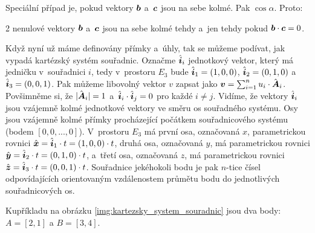 Speciální případ je, pokud vektory \(\boldsymbol{b}\) a~\(\boldsymbol{c}\) jsou na sebe kolmé. Pak \(\cos \alpha\). Proto:

\begin{fact}
2 nenulové vektory \(\boldsymbol{b}\) a~\(\boldsymbol{c}\) jsou na sebe kolmé tehdy a~jen tehdy pokud \(\boldsymbol{b} \cdot \boldsymbol{c} = 0\).
\end{fact}

Když nyní už máme definovány přímky a~úhly, tak se můžeme podívat, jak vypadá kartézský systém souřadnic. Označme \(\hat{\boldsymbol{i}}_i\) jednotkový vektor, který má jedničku v~souřadnici \(i\), tedy v~prostoru \(E_3\) bude \(\hat{\boldsymbol{i}}_1 = (1, 0, 0)\), \(\hat{\boldsymbol{i}}_2 = (0, 1, 0)\) a~\(\hat{\boldsymbol{i}}_3 = (0, 0, 1)\). Pak můžeme libovolný vektor \(v\) zapsat jako \(\boldsymbol{v} = \sum_{i=1}^n u_i \cdot \hat{\boldsymbol{A}}_i\). Povšimněme si, že \(|\hat{\boldsymbol{A}}_i| = 1\) a~\(\hat{\boldsymbol{i}}_i \cdot \hat{\boldsymbol{i}}_j = 0\) pro každé \(i \neq j\). Vidíme, že vektory \(\hat{\boldsymbol{i}}_i\) jsou vzájemně kolmé jednotkové vektory ve směru os souřadného systému.
Osy jsou vzájemně kolmé přímky procházející počátkem souřadnicového systému (bodem \([0, 0, ..., 0]\)). V~prostoru \(E_3\) má první osa, označovaná \(x\), parametrickou rovnici \(\hat{\boldsymbol{x}} = \hat{\boldsymbol{i}}_1 \cdot t = (1, 0, 0) \cdot t\), druhá osa, označovaná \(y\), má parametrickou rovnici \(\hat{\boldsymbol{y}} = \hat{\boldsymbol{i}}_2 \cdot t = (0, 1, 0) \cdot t\), a~třetí osa, označovaná \(z\), má parametrickou rovnici \(\hat{\boldsymbol{z}} = \hat{\boldsymbol{i}}_3 \cdot t = (0, 0, 1) \cdot t\).
Souřadnice jekéhokoli bodu je pak \(n\)-tice čísel odpovídajících orientovaným vzdálenostem průmětu bodu do jednotlivých souřadnicových os.

Kupříkladu na obrázku \ref{img:kartezsky_system_souradnic} jsou dva body: \(A = [2, 1]\) a \(B = [3, 4]\).


